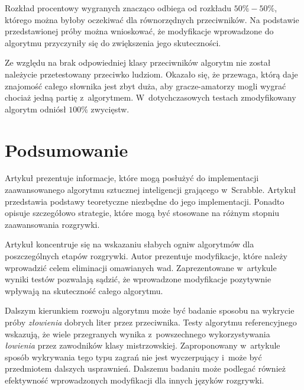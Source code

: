 \documentclass[a4paper,twocolumn,12pt]{article}
\theoremstyle{definition}
\begin{document}
Rozkład procentowy wygranych znacząco odbiega od rozkładu $50\% - 50\%$, którego można byłoby oczekiwać dla równorzędnych przeciwników. Na podstawie przedstawionej próby można wnioskować, że modyfikacje wprowadzone do algorytmu przyczyniły się do zwiększenia jego skuteczności.

Ze względu na brak odpowiedniej klasy przeciwników algorytm nie został należycie przetestowany przeciwko ludziom. Okazało się, że przewaga, którą daje znajomość całego słownika jest zbyt duża, aby gracze-amatorzy mogli wygrać chociaż jedną partię z~algorytmem. W~dotychczasowych testach zmodyfikowany algorytm odniósł $100\%$ zwycięstw.

\section*{Podsumowanie}

Artykuł prezentuje informacje, które mogą posłużyć do implementacji zaawansowanego algorytmu sztucznej inteligencji grającego w~Scrabble. Artykuł przedstawia podstawy teoretyczne niezbędne do jego implementacji. Ponadto opisuje szczegółowo  strategie, które mogą być stosowane na różnym stopniu zaawansowania rozgrywki. 

Artykuł koncentruje się na wskazaniu słabych ogniw algorytmów dla poszczególnych etapów rozgrywki. Autor prezentuje modyfikacje, które należy wprowadzić celem eliminacji omawianych wad. Zaprezentowane w~artykule wyniki testów pozwalają sądzić, że wprowadzone modyfikacje pozytywnie wpływają na skuteczność całego algorytmu. 

Dalszym kierunkiem rozwoju algorytmu może być badanie sposobu na wykrycie próby \emph{złowienia} dobrych liter przez przeciwnika. Testy algorytmu referencyjnego wskazują, że wiele przegranych wynika z~powszechnego wykorzystywania \emph{łowienia} przez zawodników klasy mistrzowskiej. Zaproponowany w~artykule sposób wykrywania tego typu zagrań nie jest wyczerpujący i~może być przedmiotem dalszych usprawnień. Dalszemu badaniu może podlegać również efektywność wprowadzonych modyfikacji dla innych języków rozgrywki.
\end{document}
